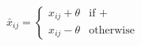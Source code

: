 \documentclass[preview]{standalone}
\begin{document}
\begin{center}
$\bar{x}_{ij} = \begin{cases} x_{ij} + \theta & \text{if } + \\ x_{ij} - \theta & \text{otherwise} \end{cases}$
\end{center}
\end{document}
